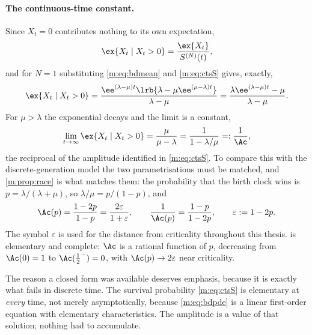 \paragraph{The continuous-time constant.}
Since $X_t=0$ contributes nothing to its own expectation,
\begin{equation}
\label{m:eq:condit}
\ex{X_t\mid X_t>0} = \frac{\ex{X_t}}{S^{(N)}(t)} ,
\end{equation}
and for $N=1$ substituting \cref{m:eq:bdmean} and \cref{m:eq:ctsS} gives, exactly,
\begin{equation}
\label{m:eq:ctscondmean}
\ex{X_t\mid X_t>0}
= \frac{\ee^{(\lambda-\mu)t}\lrb{\lambda-\mu\ee^{(\mu-\lambda)t}}}{\lambda-\mu}
= \frac{\lambda\ee^{(\lambda-\mu)t}-\mu}{\lambda-\mu} .
\end{equation}
For $\mu>\lambda$ the exponential decays and the limit is a constant,
\begin{equation}
\label{m:eq:ctsqsmean}
\lim_{t\to\infty}\ex{X_t\mid X_t>0} = \frac{\mu}{\mu-\lambda}
= \frac{1}{1-\lambda/\mu}
=: \frac{1}{\Ac} ,
\end{equation}
the reciprocal of the amplitude identified in \cref{m:eq:ctsS}. To compare this with
the discrete-generation model the two parametrisations must be matched, and
\cref{m:prop:race} is what matches them: the probability that the birth clock wins
is $p=\lambda/(\lambda+\mu)$, so $\lambda/\mu=p/(1-p)$, and
\begin{equation}
\label{m:eq:Acts}
\Ac(p) = \frac{1-2p}{1-p} = \frac{2\varepsilon}{1+\varepsilon},
\qquad
\frac{1}{\Ac(p)} = \frac{1-p}{1-2p},
\qquad
\varepsilon := 1-2p .
\end{equation}
The symbol $\varepsilon$ is used for the distance from criticality throughout this
thesis.  is elementary and complete: $\Ac$ is a rational function of
$p$, decreasing from $\Ac(0)=1$ to $\Ac(\tfrac12^-)=0$, with
$\Ac(p)\to2\varepsilon$ near criticality.

The reason a closed form was available deserves emphasis, because it is exactly
what fails in discrete time. The survival probability \cref{m:eq:ctsS} is elementary
at \emph{every} time, not merely asymptotically, because \cref{m:eq:bdpde} is a
linear first-order equation with elementary characteristics. The amplitude is a
value of that solution; nothing had to accumulate.

